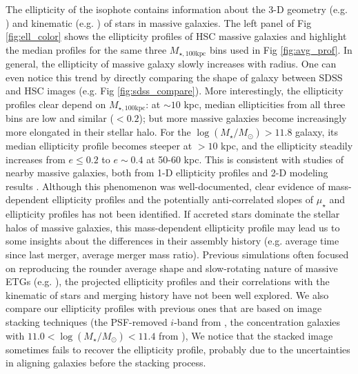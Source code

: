 \documentclass[a4paper,fleqn,usenatbib]{mnras}
\def\logms{{$\log (M_{\star}/M_{\odot})$}}
\def\mtot{{$M_{\star,100\mathrm{kpc}}$}}
\def\mden{{$\mu_{\star}$}}
\begin{document}
	The ellipticity of the isophote contains information about the 3-D geometry 
	(e.g. \citealt{Chang2013, Mitsuda2017}) and kinematic (e.g. 
	\citealt{Cappellari2012, Weijmans2014}) of stars in massive galaxies.  
	The left panel of Fig \ref{fig:ell_color} shows the ellipticity profiles of HSC 
	massive galaxies and highlight the median profiles for the same three \mtot{} 
	bins used in Fig \ref{fig:avg_prof}. 
	In general, the ellipticity of massive galaxy slowly increases with radius.
	One can even notice this trend by directly comparing the shape of galaxy between 
	SDSS and HSC images (e.g. Fig \ref{fig:sdss_compare}).  
	More interestingly, the ellipticity profiles clear depend on \mtot{}: 
	at ${\sim} 10$ kpc, median ellipticities from all three bins are low and similar 
	($< 0.2$); but more massive galaxies become increasingly more elongated in their
	stellar halo. 	
	For the \logms{}$>11.8$ galaxy, its median ellipticity profile becomes steeper 
	at $>10$ kpc, and the ellipticity steadily increases from $e\le 0.2$ to 
	$e{\sim} 0.4$ at 50-60 kpc.
	This is consistent with studies of nearby massive galaxies, both from 1-D 
	ellipticity profiles and 2-D modeling results \citep{Gonzalez2005, 
	Huang2013a, Spavone2017}.
	Although this phenomenon was well-documented, clear evidence of mass-dependent
	ellipticity profiles and the potentially anti-correlated slopes of \mden{} and 
	ellipticity profiles has not been identified.
	If accreted stars dominate the stellar halos of massive galaxies, this 
	mass-dependent ellipticity profile may lead us to some insights about the 
	differences in their assembly history (e.g. average time since last merger, 
	average merger mass ratio).
	Previous simulations often focused on reproducing the rounder average shape 
	and slow-rotating nature of massive ETGs (e.g. \citealt{Wu2014}), the projected 
	ellipticity profiles and their correlations with the kinematic of stars and 
	merging history have not been well explored. 
	We also compare our ellipticity profiles with previous ones that are based on 
	image stacking techniques (the PSF-removed $i$-band from \citealt{Tal2011}, 
	the concentration galaxies with $11.0<$\logms{}$<11.4$ from 
	\citealt{DSouza2015}), 
	We notice that the stacked image sometimes fails to recover the ellipticity 
	profile, probably due to the uncertainties in aligning galaxies before the 
	stacking process.
    
\end{document}
